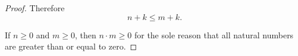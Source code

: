 \begin{proof}
  Therefore
  \begin{equation*}
    n + k \leq m + k.
  \end{equation*}

   If \( n \geq 0 \) and \( m \geq 0 \), then \( n \cdot m \geq 0 \) for the sole reason that all natural numbers are greater than or equal to zero.
\end{proof}
